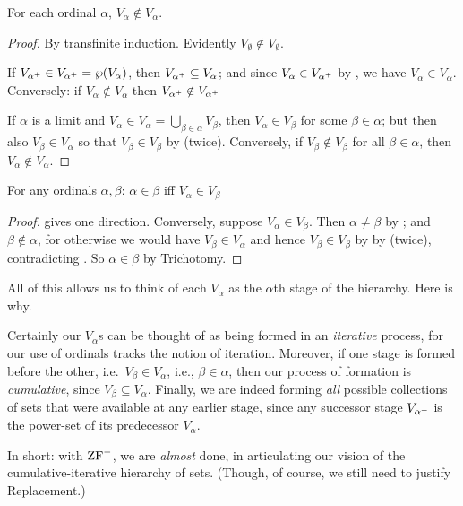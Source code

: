 \documentclass[../../../include/open-logic-section]{subfiles}
\begin{document}
\begin{lem}
For each ordinal $\alpha$, $V_\alpha \notin V_\alpha$.
\end{lem}

\begin{proof}
By transfinite induction. Evidently $V_\emptyset \notin V_\emptyset$. 

If $V_{\alpha^{+}} \in V_{\alpha^{+}} = \wp(V_\alpha)$,
then $V_{\alpha^{+}} \subseteq V_\alpha$; and since $V_\alpha
\in V_{\alpha^{+}}$ by , we have
$V_\alpha \in V_\alpha$. Conversely: if $V_\alpha \notin V_\alpha$
then $V_{\alpha^{+}} \notin V_{\alpha^{+}}$

If $\alpha$ is a limit and $V_\alpha \in V_\alpha = \bigcup_{\beta \in
\alpha}V_\beta$, then $V_\alpha \in V_\beta$ for some $\beta \in
\alpha$; but then also $V_\beta \in V_\alpha$ so that $V_\beta \in
V_\beta$ by  (twice). Conversely, if $V_\beta
\notin V_\beta$ for all $\beta \in \alpha$, then $V_\alpha \notin
V_\alpha$.
\end{proof}

\begin{cor}
For any ordinals $\alpha, \beta$: $\alpha \in \beta$ iff $V_\alpha \in V_\beta$
\end{cor}

\begin{proof}
 gives one direction. Conversely, suppose $V_\alpha \in V_\beta$. Then $\alpha \neq \beta$ by ; and $\beta \notin \alpha$, for otherwise we would have $V_\beta \in V_\alpha$ and hence $V_\beta \in V_\beta$ by by  (twice), contradicting . So $\alpha \in \beta$ by Trichotomy.
\end{proof}

All of this allows us to think of each $V_\alpha$ as the $\alpha$th
stage of the hierarchy. Here is why.

Certainly our $V_\alpha$s can be thought of as being formed in an
\emph{iterative} process, for our use of ordinals tracks the notion of
iteration. Moreover, if one stage is formed before the other, i.e.\
$V_\beta \in V_\alpha$, i.e., $\beta \in \alpha$, then our process of
formation is \emph{cumulative}, since $V_\beta \subseteq V_\alpha$.
Finally, we are indeed forming \emph{all} possible collections of sets
that were available at any earlier stage, since any successor stage
$V_{\alpha^{+}}$ is the power-set of its predecessor $V_\alpha$.

In short: with $\mathrm{ZF}^{-}$, we are \emph{almost} done, in articulating
our vision of the cumulative-iterative hierarchy of sets. (Though, of
course, we still need to justify Replacement.)
\end{document}
